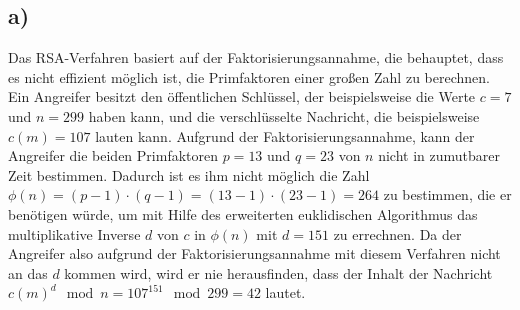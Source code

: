 \documentclass[ngerman]{fbi-aufgabenblatt}
\begin{document}
    \setcounter{section}{5}
	
	
	\subsection*{a)}
	
	Das RSA-Verfahren basiert auf der Faktorisierungsannahme, die behauptet, dass es nicht effizient möglich ist, die Primfaktoren einer großen Zahl zu berechnen. \\
	Ein Angreifer besitzt den öffentlichen Schlüssel, der beispielsweise die Werte $c=7$ und $n=299$ haben kann, und die verschlüsselte Nachricht, die beispielsweise $c(m)=107$ lauten kann. Aufgrund der Faktorisierungsannahme, kann der Angreifer die beiden Primfaktoren $p=13$ und $q=23$ von $n$ nicht in zumutbarer Zeit bestimmen. Dadurch ist es ihm nicht möglich die Zahl $\phi(n)=(p-1)\cdot(q-1)=(13-1)\cdot(23-1)=264$ zu bestimmen, die er benötigen würde, um mit Hilfe des erweiterten euklidischen Algorithmus das multiplikative Inverse $d$ von $c$ in $\phi(n)$ mit $d=151$ zu errechnen. Da der Angreifer also aufgrund der Faktorisierungsannahme mit diesem Verfahren nicht an das $d$ kommen wird, wird er nie herausfinden, dass der Inhalt der Nachricht $c(m)^d \mod n = 107^{151} \mod 299 = 42$ lautet.
	
\end{document}
